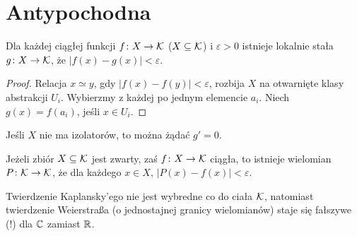 \section{Antypochodna}
\begin{fakt}
	Dla  każdej ciągłej funkcji $f \colon X \to \mathcal K$ ($X \subseteq \mathcal K$) i $\varepsilon > 0$ istnieje lokalnie stała $g \colon X \to \mathcal K$, że $|f(x) - g(x)| < \varepsilon$.
\end{fakt}

\begin{proof}
	Relacja $x \simeq y$, gdy $|f(x) - f(y)| < \varepsilon$, rozbija $X$ na otwarnięte klasy abstrakcji $U_i$.
	Wybierzmy z każdej po jednym elemencie $a_i$.
	Niech $g(x) = f(a_i)$, jeśli $x \in U_i$.
\end{proof}

\begin{wniosek}
	Jeśli $X$ nie ma izolatorów, to można żądać $g' = 0$.
\end{wniosek}

\begin{twierdzenie}[Kaplansky]
	Jeżeli  zbiór $X \subseteq \mathcal K$ jest zwarty, zaś $f \colon X \to \mathcal K$ ciągła, to istnieje wielomian $P \colon \mathcal K \to \mathcal K$, że dla każdego $x \in X$, $|P(x) - f(x)| < \varepsilon$.
\end{twierdzenie}

Twierdzenie Kaplansky'ego nie jest wybredne co do ciała $\mathcal K$, natomiast twierdzenie Weierstraßa (o jednostajnej granicy wielomianów) staje się fałszywe (!) dla $\mathbb C$ zamiast $\mathbb R$.

